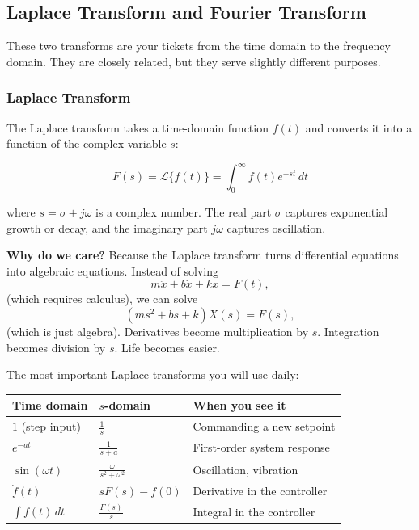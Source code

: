 \subsection{Laplace Transform and Fourier Transform}

These two transforms are your tickets from the time domain to the frequency domain. They are closely related, but they serve slightly different purposes.

\subsubsection{Laplace Transform}

The Laplace transform takes a time-domain function $f(t)$ and converts it into a function of the complex variable $s$:

\begin{equation}
F(s) = \mathcal{L}\{f(t)\} = \int_0^{\infty} f(t) e^{-st} \, dt
\end{equation}

where $s = \sigma + j\omega$ is a complex number. The real part $\sigma$ captures exponential growth or decay, and the imaginary part $j\omega$ captures oscillation.

\textbf{Why do we care?} Because the Laplace transform turns differential equations into algebraic equations. Instead of solving
\[
m\ddot{x} + b\dot{x} + kx = F(t),
\]
(which requires calculus), we can solve
\[
(ms^2 + bs + k)X(s) = F(s),
\]
(which is just algebra). Derivatives become multiplication by $s$. Integration becomes division by $s$. Life becomes easier.

The most important Laplace transforms you will use daily:

\begin{center}
\begin{tabular}{lll}
\toprule
\textbf{Time domain} & \textbf{$s$-domain} & \textbf{When you see it} \\
\midrule
$1$ (step input) & $\frac{1}{s}$ & Commanding a new setpoint \\
$e^{-at}$ & $\frac{1}{s+a}$ & First-order system response \\
$\sin(\omega t)$ & $\frac{\omega}{s^2 + \omega^2}$ & Oscillation, vibration \\
$\dot{f}(t)$ & $sF(s) - f(0)$ & Derivative in the controller \\
$\int f(t)\,dt$ & $\frac{F(s)}{s}$ & Integral in the controller \\
\bottomrule
\end{tabular}
\end{center}

